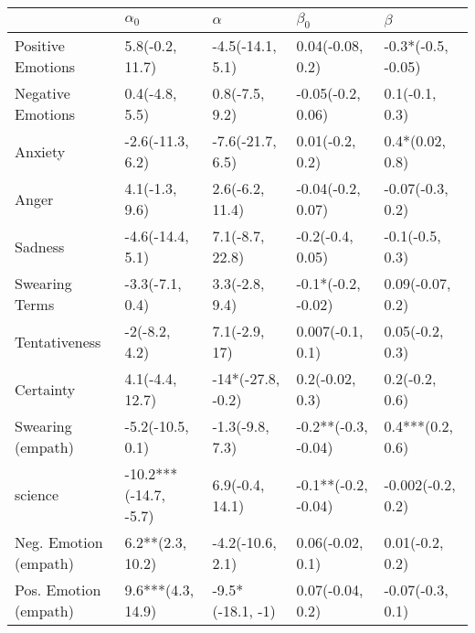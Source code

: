 \begin{tabular}{lllll}
\toprule
{} &             $\alpha_0$ &           $\alpha$ &            $\beta_0$ &             $\beta$ \\
\midrule
Positive Emotions     &        5.8(-0.2, 11.7) &   -4.5(-14.1, 5.1) &     0.04(-0.08, 0.2) &  -0.3*(-0.5, -0.05) \\
Negative Emotions     &         0.4(-4.8, 5.5) &     0.8(-7.5, 9.2) &    -0.05(-0.2, 0.06) &      0.1(-0.1, 0.3) \\
Anxiety               &       -2.6(-11.3, 6.2) &   -7.6(-21.7, 6.5) &      0.01(-0.2, 0.2) &     0.4*(0.02, 0.8) \\
Anger                 &         4.1(-1.3, 9.6) &    2.6(-6.2, 11.4) &    -0.04(-0.2, 0.07) &    -0.07(-0.3, 0.2) \\
Sadness               &       -4.6(-14.4, 5.1) &    7.1(-8.7, 22.8) &     -0.2(-0.4, 0.05) &     -0.1(-0.5, 0.3) \\
Swearing Terms        &        -3.3(-7.1, 0.4) &     3.3(-2.8, 9.4) &   -0.1*(-0.2, -0.02) &    0.09(-0.07, 0.2) \\
Tentativeness         &          -2(-8.2, 4.2) &      7.1(-2.9, 17) &     0.007(-0.1, 0.1) &     0.05(-0.2, 0.3) \\
Certainty             &        4.1(-4.4, 12.7) &  -14*(-27.8, -0.2) &      0.2(-0.02, 0.3) &      0.2(-0.2, 0.6) \\
Swearing (empath)     &       -5.2(-10.5, 0.1) &    -1.3(-9.8, 7.3) &  -0.2**(-0.3, -0.04) &    0.4***(0.2, 0.6) \\
science               &  -10.2***(-14.7, -5.7) &    6.9(-0.4, 14.1) &  -0.1**(-0.2, -0.04) &   -0.002(-0.2, 0.2) \\
Neg. Emotion (empath) &       6.2**(2.3, 10.2) &   -4.2(-10.6, 2.1) &     0.06(-0.02, 0.1) &     0.01(-0.2, 0.2) \\
Pos. Emotion (empath) &      9.6***(4.3, 14.9) &   -9.5*(-18.1, -1) &     0.07(-0.04, 0.2) &    -0.07(-0.3, 0.1) \\
\bottomrule
\end{tabular}
